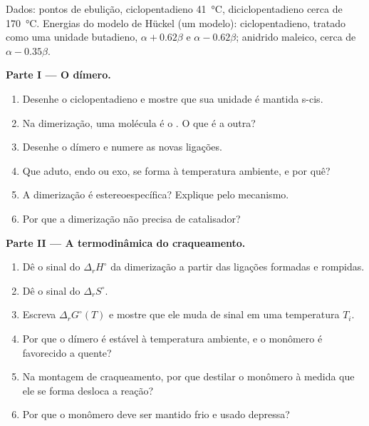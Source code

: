 \begin{problem}
\label{pb:b2:frontier-orbitals:1}
Dados: pontos de ebulição, ciclopentadieno \qty{41}{\degreeCelsius},
diciclopentadieno cerca de \qty{170}{\degreeCelsius}. Energias do modelo de
Hückel (um modelo): ciclopentadieno, tratado como uma unidade butadieno, 
$\alpha + 0.62\beta$ e  $\alpha - 0.62\beta$; anidrido maleico, 
cerca de $\alpha - 0.35\beta$.

\medskip
\noindent\textbf{Parte I --- O dímero.}
\begin{enumerate}
  \item Desenhe o ciclopentadieno e mostre que sua unidade  é mantida s-cis.
  \item Na dimerização, uma molécula é o . O que é a outra?
  \item Desenhe o dímero e numere as novas ligações.
  \item Que aduto, endo ou exo, se forma à temperatura ambiente, e por quê?
  \item A dimerização é estereoespecífica? Explique pelo mecanismo.
  \item Por que a dimerização não precisa de catalisador?
\end{enumerate}

\medskip
\noindent\textbf{Parte II --- A termodinâmica do craqueamento.}
\begin{enumerate}[resume]
  \item Dê o sinal do $\Delta_r H^\circ$ da dimerização a partir das ligações
        formadas e rompidas.
  \item Dê o sinal do $\Delta_r S^\circ$.
  \item Escreva $\Delta_r G^\circ(T)$ e mostre que ele muda de sinal em uma temperatura $T_i$.
  \item Por que o dímero é estável à temperatura ambiente, e o monômero é favorecido a quente?
  \item Na montagem de craqueamento, por que destilar o monômero à medida que
        ele se forma desloca a reação?
  \item Por que o monômero deve ser mantido frio e usado depressa?
\end{enumerate}


\end{problem}

